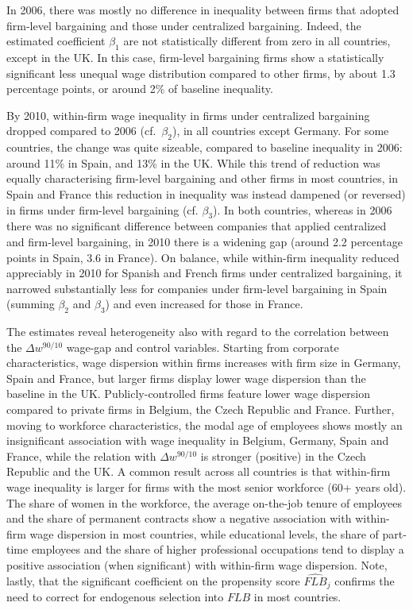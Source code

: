 \documentclass[12pt]{article}
\begin{document}
In 2006, there was mostly no difference in inequality between firms that adopted firm-level bargaining and those under centralized bargaining. Indeed, the estimated  coefficient $\beta_1$ are not statistically different from zero in all countries, except in the UK. In this case, firm-level bargaining firms show a statistically significant less unequal wage distribution compared to other firms, by about 1.3 percentage points, or around 2\% of baseline inequality.

By 2010, within-firm wage inequality in firms under centralized bargaining dropped compared to 2006 (cf.~$\beta_2$), in all countries except Germany. For some countries, the change was quite sizeable, compared to baseline inequality in 2006: around 11\% in Spain, and 13\% in the UK. While this trend of reduction was equally characterising firm-level bargaining and other firms in most countries, in Spain and France this reduction in inequality was instead dampened (or reversed) in firms under firm-level bargaining (cf. $\beta_3$). In both countries, whereas in 2006 there was no significant difference between companies that applied centralized and firm-level bargaining, in 2010 there is a widening gap (around 2.2 percentage points in Spain, 3.6 in France). On balance, while within-firm inequality reduced appreciably in 2010 for Spanish and French firms under centralized bargaining, it narrowed substantially less for companies under firm-level bargaining in Spain (summing $\beta_2$ and $\beta_3$) and even increased for those in France. 

The estimates reveal heterogeneity also with regard to the correlation between the $\Delta w^{90/10}$ wage-gap and control variables. Starting from corporate characteristics, wage dispersion within firms increases with firm size in Germany, Spain and France, but larger firms display lower wage dispersion than the baseline in the UK. Publicly-controlled firms feature lower wage dispersion compared to private firms in Belgium, the Czech Republic and France. Further, moving to workforce characteristics, the modal age of employees shows mostly an insignificant association with wage inequality in Belgium, Germany, Spain and France, while the relation with $\Delta w^{90/10}$ is stronger (positive) in the Czech Republic and the UK. A common result across all countries is that within-firm wage inequality is larger for firms with the most senior workforce (60+ years old). The share of women in the workforce, the average on-the-job tenure of employees and the share of permanent contracts show a negative association with within-firm wage dispersion in most countries, while educational levels, the share of part-time employees and the share of higher professional occupations tend to display a positive association (when significant) with within-firm wage dispersion. Note, lastly, that the significant coefficient on the propensity score $\widehat{\mathit{FLB}}_j$ confirms the need to correct for endogenous selection into $\mathit{FLB}$ in most countries.
\end{document}
